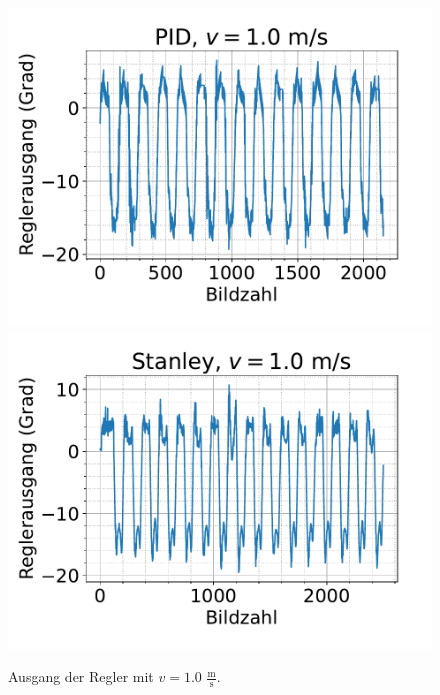 \documentclass[arbeit=studie,oneside,BCOR=12mm]{ArbeitRST}
\begin{document}
\begin{figure}[h]
    \centering
    \includegraphics[scale=0.47]{pid1.0}
    \includegraphics[scale=0.47]{Stan1.0}
    \caption{Ausgang der Regler mit $v = 1.0$ $\frac{\mathrm{m}}{\mathrm{s}}$.}
    \label{reg:1.0}
\end{figure}
\end{document}
